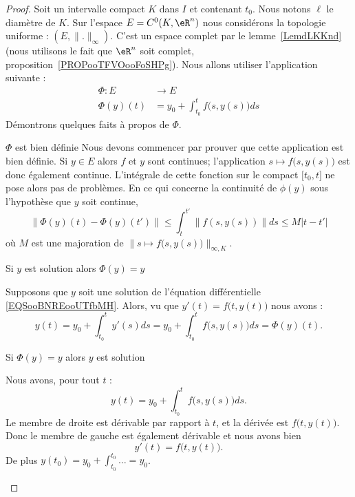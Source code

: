 \begin{proof}
	Soit un intervalle compact \( K\) dans \( I\) et contenant \( t_0\). Nous notons \( \ell\) le diamètre de \( K\). Sur l'espace \( E=C^0(K,\eR^n)\) nous considérons la topologie uniforme : \( (E,\| . \|_{\infty})\). C'est un espace complet par le lemme~\ref{LemdLKKnd} (nous utilisons le fait que \( \eR^n\) soit complet, proposition~\ref{PROPooTFVOooFoSHPg}). Nous allons utiliser l'application suivante :
	\begin{equation}        \label{EQooJUTBooILBKoE}
		\begin{aligned}
			\Phi\colon E & \to E                                  \\
			\Phi(y)(t)   & =y_0+\int_{t_0}^tf\big( s,y(s) \big)ds
		\end{aligned}
	\end{equation}
	Démontrons quelques faits à propos de \( \Phi\).
	\begin{subproof}
		\item[\( \Phi\) est bien définie]
		Nous devons commencer par prouver que cette application est bien définie. Si \( y\in E\) alors \( f\) et \( y\) sont continues; l'application \( s\mapsto f\big(s,y(s)\big)\) est donc également continue. L'intégrale de cette fonction sur le compact \( \mathopen[ t_0 , t \mathclose]\) ne pose alors pas de problèmes. En ce qui concerne la continuité de \( \phi(y)\) sous l'hypothèse que \( y\) soit continue,
		\begin{equation}
			\| \Phi(y)(t)-\Phi(y)(t') \|\leq \int_t^{t'}\| f(s,y(s)) \|ds\leq M| t-t' |
		\end{equation}
		où \( M\) est une majoration de \( \| s\mapsto f\big( s,y(s) \big) \|_{\infty,K}\).

		\item[Si \( y\) est solution alors \( \Phi(y)=y\)]

		Supposons que \( y\) soit une solution de l'équation différentielle \eqref{EQSooBNREooUTfbMH}. Alors, vu que \( y'(t)=f\big( t,y(t) \big)\) nous avons :
		\begin{equation}
			y(t)=y_0+\int_{t_0}^ty'(s)ds=y_0+\int_{t_0}^tf\big( s,y(s) \big)ds=\Phi(y)(t).
		\end{equation}

		\item[Si \( \Phi(y)=y\) alors \( y\) est solution]

		Nous avons, pour tout \( t\) :
		\begin{equation}
			y(t)=y_0+\int_{t_0}^tf\big( s,y(s) \big)ds.
		\end{equation}
		Le membre de droite est dérivable par rapport à \( t\), et la dérivée est \( f\big( t,y(t) \big) \). Donc le membre de gauche est également dérivable et nous avons bien
		\begin{equation}
			y'(t)=f\big( t,y(t) \big).
		\end{equation}
		De plus \( y(t_0)=y_0+\int_{t_0}^{t_0}\ldots=y_0\).
	\end{subproof}


\end{proof}

